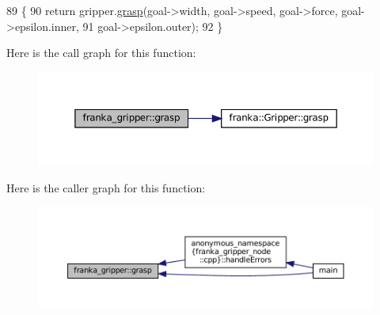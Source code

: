 \begin{DoxyCode}
89                                                                         \{
90   \textcolor{keywordflow}{return} gripper.\hyperlink{classfranka_1_1Gripper_abff6a03a6c75b9079bd4b9b5ca380254}{grasp}(goal->width, goal->speed, goal->force, goal->epsilon.inner,
91                        goal->epsilon.outer);
92 \}
\end{DoxyCode}
Here is the call graph for this function\+:
\nopagebreak
\begin{figure}[H]
\begin{center}
\leavevmode
\includegraphics[width=350pt]{namespacefranka__gripper_a0233f74b5d7107ae71083e17a024c676_cgraph}
\end{center}
\end{figure}
Here is the caller graph for this function\+:
\nopagebreak
\begin{figure}[H]
\begin{center}
\leavevmode
\includegraphics[width=350pt]{namespacefranka__gripper_a0233f74b5d7107ae71083e17a024c676_icgraph}
\end{center}
\end{figure}
\mbox{\label{namespacefranka__gripper_ae9fb03aae11c03a4ad2c5d5c88b80166}} 
